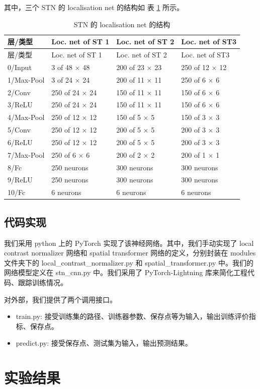 \documentclass{report}
\begin{document}
其中，三个 STN 的 localisation net 的结构如 表 \ref{tbl:stn} 所示。

\begin{longtable}[]{@{}llll@{}}
  \caption{\label{tbl:stn}STN 的 localisation net 的结构}\tabularnewline
  \toprule
  层/类型 & Loc. net of ST 1 & Loc. net of ST 2 & Loc. net of ST3\tabularnewline
  \midrule
  \endfirsthead
  \toprule
  层/类型 & Loc. net of ST 1 & Loc. net of ST 2 & Loc. net of ST3\tabularnewline
  \midrule
  \endhead
  0/Input & 3 of 48 × 48 & 200 of 23 × 23 & 250 of 12 × 12\tabularnewline
  1/Max-Pool & 3 of 24 × 24 & 200 of 11 × 11 & 250 of 6 × 6\tabularnewline
  2/Conv & 250 of 24 × 24 & 150 of 11 × 11 & 150 of 6 × 6\tabularnewline
  3/ReLU & 250 of 24 × 24 & 150 of 11 × 11 & 150 of 6 × 6\tabularnewline
  4/Max-Pool & 250 of 12 × 12 & 150 of 5 × 5 & 150 of 3 × 3\tabularnewline
  5/Conv & 250 of 12 × 12 & 200 of 5 × 5 & 200 of 3 × 3\tabularnewline
  6/ReLU & 250 of 12 × 12 & 200 of 5 × 5 & 200 of 3 × 3\tabularnewline
  7/Max-Pool & 250 of 6 × 6 & 200 of 2 × 2 & 200 of 1 × 1\tabularnewline
  8/Fc & 250 neurons & 300 neurons & 300 neurons\tabularnewline
  9/ReLU & 250 neurons & 300 neurons & 300 neurons\tabularnewline
  10/Fc & 6 neurons & 6 neurons & 6 neurons\tabularnewline
  \bottomrule
\end{longtable}

\subsection{代码实现}

我们采用 python 上的 PyTorch 实现了该神经网络。其中，我们手动实现了 local contrast normalizer 网络和 spatial transformer 网络的定义，分别封装在 modules 文件夹下的 local\_contrast\_normalizer.py 和 spatial\_transformer.py 中。我们的网络模型定义在 stn\_cnn.py 中。我们采用了 PyTorch-Lightning 库来简化工程代码、跟踪训练情况。

对外部，我们提供了两个调用接口。

\begin{itemize}
  \item train.py: 接受训练集的路径、训练器参数、保存点等为输入，输出训练评价指标、保存点。
  \item predict.py: 接受保存点、测试集为输入，输出预测结果。
\end{itemize}

\section{实验结果}
\end{document}
